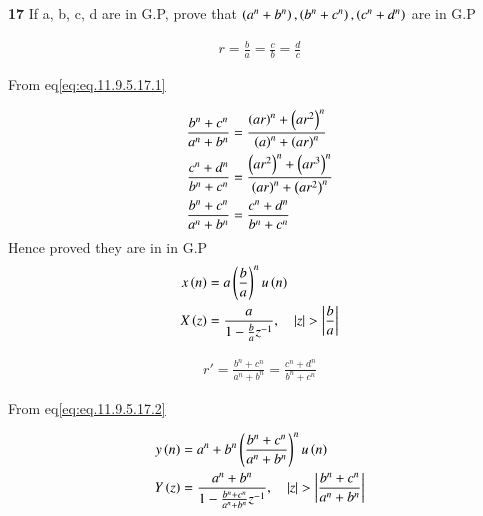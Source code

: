 \documentclass[journal,12pt,twocolumn]{IEEEtran}
\theoremstyle{remark}
\begin{document}


\vspace{3cm}

\title{}
\author{EE23BTECH11047 - Deepakreddy P
}
\maketitle
\newpage
\bigskip

\noindent \textbf{17} \quad 
If a, b, c, d are in G.P, prove that 
$ \left(a^{n} + b^{n}\right),\left(b^{n} + c^{n}\right),\left(c^{n} + d^{n}\right) $ are in G.P \\
\solution

\begin{center}
    \begin{table}[ht]
        
    \end{table}
\end{center}


\begin{align}   
r=\frac{b}{a} = \frac{c}{b}= \frac{d}{c} \label{eq:eq.11.9.5.17.1}
\end{align}

From eq\eqref{eq:eq.11.9.5.17.1}

\begin{align}
\frac{b^n + c^n}{a^n + b^n}
&= \frac{\left(ar\right)^n + \left(ar^2\right)^n}{\left(a\right)^n + \left(ar\right)^n}\\
\frac{c^n + d^n}{b^n + c^n}&= \frac{\left(ar^2\right)^n + \left(ar^3\right)^n}{\left(ar\right)^n + \left(ar^2\right)^n}\\
\frac{b^n + c^n}{a^n + b^n} &= \frac{c^n + d^n}{b^n + c^n}
\end{align}
Hence proved they are in in G.P\\

\begin{align}
    x\left(n\right) &= a\left(\frac{b}{a}\right)^{n} u\left(n\right)\\
    X\left(z\right) &= \frac{a}{1-\frac{b}{a} z^{-1}}, \quad \left\vert z\right\vert>\left\vert\frac{b}{a}\right\vert
\end{align}

\begin{align}   
r'=\frac{b^n + c^n}{a^n + b^n} = \frac{c^n + d^n}{b^n + c^n} \label{eq:eq.11.9.5.17.2}
\end{align}

From eq\eqref{eq:eq.11.9.5.17.2}

\begin{align}
    y\left(n\right) &= a^n + b^n \left(\frac{b^n + c^n}{a^n + b^n}\right)^{n} u\left(n\right)\\
    Y\left(z\right) &= \frac{a^n + b^n}{1-\frac{b^n + c^n}{a^n + b^n} z^{-1}}, \quad \left\vert z\right\vert>\left\vert\frac{b^n + c^n}{a^n + b^n}\right\vert
\end{align}
\end{document}
